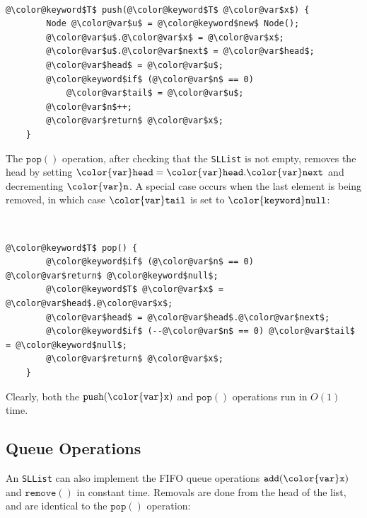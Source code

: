 \documentclass[10pt]{book}
\theoremstyle{plain}
\theoremstyle{definition}
\begin{document}
 \ \vspace{.5ex}\begin{Verbatim}[gobble=1,tabsize=2,frame=single,framerule=1.2pt,commandchars=\\@\$,label=\texttt{SLList},labelposition=topline]
	@\color@keyword$T$ push(@\color@keyword$T$ @\color@var$x$) {
		Node @\color@var$u$ = @\color@keyword$new$ Node();
		@\color@var$u$.@\color@var$x$ = @\color@var$x$;
		@\color@var$u$.@\color@var$next$ = @\color@var$head$;
		@\color@var$head$ = @\color@var$u$;
		@\color@keyword$if$ (@\color@var$n$ == 0)
			@\color@var$tail$ = @\color@var$u$;
		@\color@var$n$++;
		@\color@var$return$ @\color@var$x$;
	}
\end{Verbatim}


The \ensuremath{\mathtt{pop()}} operation, after checking that the \texttt{SLList} is not empty,
removes the head by setting $\ensuremath{\mathtt{{\color{var}head}={\color{var}head}.{\color{var}next}}}$ and decrementing \ensuremath{\mathtt{{\color{var}n}}}.
A special case occurs when the last element is being removed, in which case \ensuremath{\mathtt{{\color{var}tail}}} is set to \ensuremath{\mathtt{{\color{keyword}null}}}:



 \ \vspace{.5ex}\begin{Verbatim}[gobble=1,tabsize=2,frame=single,framerule=1.2pt,commandchars=\\@\$,label=\texttt{SLList},labelposition=topline]
	@\color@keyword$T$ pop() {
		@\color@keyword$if$ (@\color@var$n$ == 0)	@\color@var$return$ @\color@keyword$null$;
		@\color@keyword$T$ @\color@var$x$ = @\color@var$head$.@\color@var$x$;
		@\color@var$head$ = @\color@var$head$.@\color@var$next$;
		@\color@keyword$if$ (--@\color@var$n$ == 0) @\color@var$tail$ = @\color@keyword$null$;
		@\color@var$return$ @\color@var$x$;
	}	
\end{Verbatim}


Clearly, both the \ensuremath{\mathtt{push({\color{var}x})}} and \ensuremath{\mathtt{pop()}} operations run in $O(1)$ time.

\subsection{Queue Operations}

An \texttt{SLList} can also implement the FIFO queue operations \ensuremath{\mathtt{add({\color{var}x})}} and
\ensuremath{\mathtt{remove()}} in constant time.  Removals are done from the head of the list,
and are identical to the \ensuremath{\mathtt{pop()}} operation:
\end{document}
